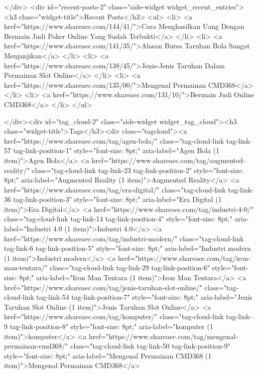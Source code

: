 			</div>
		<div id="recent-posts-2" class="side-widget widget_recent_entries">
		<h3 class="widget-title">Recent Posts</h3>
		<ul>
											<li>
					<a href="https://www.shareaec.com/144/41/">Cara Menghasilkan Uang Dengan Bermain Judi Poker Online Yang Sudah Terbukti</a>
									</li>
											<li>
					<a href="https://www.shareaec.com/141/35/">Alasan Bursa Taruhan Bola Sangat Menjanjikan</a>
									</li>
											<li>
					<a href="https://www.shareaec.com/138/45/">Jenis-Jenis Taruhan Dalam Permainan Slot Online</a>
									</li>
											<li>
					<a href="https://www.shareaec.com/135/00/">Mengenal Permainan CMD368</a>
									</li>
											<li>
					<a href="https://www.shareaec.com/131/10/">Bermain Judi Online CMD368</a>
									</li>
					</ul>

		</div><div id="tag_cloud-2" class="side-widget widget_tag_cloud"><h3 class="widget-title">Tags</h3><div class="tagcloud"><a href="https://www.shareaec.com/tag/agen-bola/" class="tag-cloud-link tag-link-57 tag-link-position-1" style="font-size: 8pt;" aria-label="Agen Bola (1 item)">Agen Bola</a>
<a href="https://www.shareaec.com/tag/augmented-reality/" class="tag-cloud-link tag-link-23 tag-link-position-2" style="font-size: 8pt;" aria-label="Augmented Reality (1 item)">Augmented Reality</a>
<a href="https://www.shareaec.com/tag/era-digital/" class="tag-cloud-link tag-link-36 tag-link-position-3" style="font-size: 8pt;" aria-label="Era Digital (1 item)">Era Digital</a>
<a href="https://www.shareaec.com/tag/industri-4-0/" class="tag-cloud-link tag-link-14 tag-link-position-4" style="font-size: 8pt;" aria-label="Industri 4.0 (1 item)">Industri 4.0</a>
<a href="https://www.shareaec.com/tag/industri-modern/" class="tag-cloud-link tag-link-6 tag-link-position-5" style="font-size: 8pt;" aria-label="Industri modern (1 item)">Industri modern</a>
<a href="https://www.shareaec.com/tag/iron-man-tentara/" class="tag-cloud-link tag-link-29 tag-link-position-6" style="font-size: 8pt;" aria-label="Iron Man Tentara (1 item)">Iron Man Tentara</a>
<a href="https://www.shareaec.com/tag/jenis-taruhan-slot-online/" class="tag-cloud-link tag-link-54 tag-link-position-7" style="font-size: 8pt;" aria-label="Jenis Taruhan Slot Online (1 item)">Jenis Taruhan Slot Online</a>
<a href="https://www.shareaec.com/tag/komputer/" class="tag-cloud-link tag-link-9 tag-link-position-8" style="font-size: 8pt;" aria-label="komputer (1 item)">komputer</a>
<a href="https://www.shareaec.com/tag/mengenal-permainan-cmd368/" class="tag-cloud-link tag-link-50 tag-link-position-9" style="font-size: 8pt;" aria-label="Mengenal Permainan CMD368 (1 item)">Mengenal Permainan CMD368</a>
